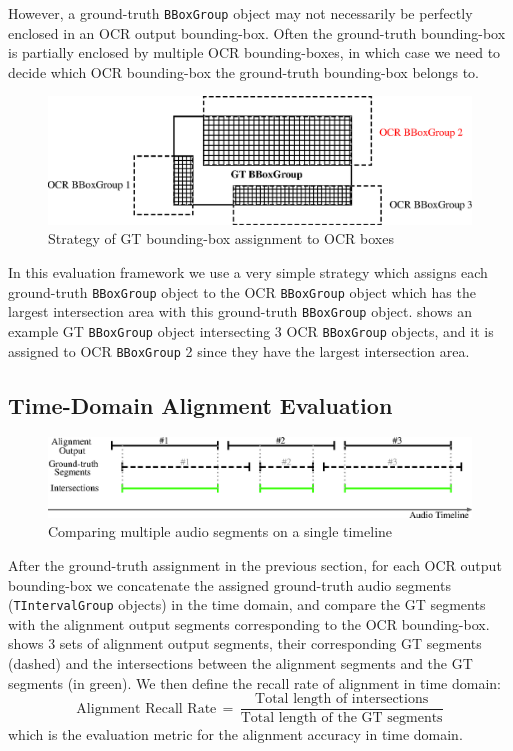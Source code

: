 However, a ground-truth \texttt{BBoxGroup} object may not necessarily be perfectly enclosed in an OCR output bounding-box. Often the ground-truth bounding-box is partially enclosed by multiple OCR bounding-boxes, in which case we need to decide which OCR bounding-box the ground-truth bounding-box belongs to.

\begin{figure}[!htb]
    \centering
    \includegraphics[width=.8\textwidth]{eval-gt-assign.eps}
    \caption{Strategy of GT bounding-box assignment to OCR boxes}
    \label{fig:eval-gt-assign}
\end{figure}

In this evaluation framework we use a very simple strategy which assigns each ground-truth \texttt{BBoxGroup} object to the OCR \texttt{BBoxGroup} object which has the largest intersection area with this ground-truth \texttt{BBoxGroup} object.  shows an example GT \texttt{BBoxGroup} object intersecting 3 OCR \texttt{BBoxGroup} objects, and it is assigned to OCR \texttt{BBoxGroup} 2 since they have the largest intersection area.

\subsection{Time-Domain Alignment Evaluation}

\begin{figure}[!tb]
    \centering
    \includegraphics[width=.9\textwidth]{eval-time-domain.eps}
    \caption{Comparing multiple audio segments on a single timeline}
    \label{fig:eval-time-domain}
\end{figure}

After the ground-truth assignment in the previous section, for each OCR output bounding-box we concatenate the assigned ground-truth audio segments (\texttt{TIntervalGroup} objects) in the time domain, and compare the GT segments with the alignment output segments corresponding to the OCR bounding-box.  shows 3 sets of alignment output segments, their corresponding GT segments (dashed) and the intersections between the alignment segments and the GT segments (in green). We then define the recall rate of alignment in time domain:
\begin{equation}
    \text{Alignment Recall Rate}\,=\,\frac{\text{Total length of intersections}}{\text{Total length of the GT segments}}
\end{equation}
which is the evaluation metric for the alignment accuracy in time domain.


